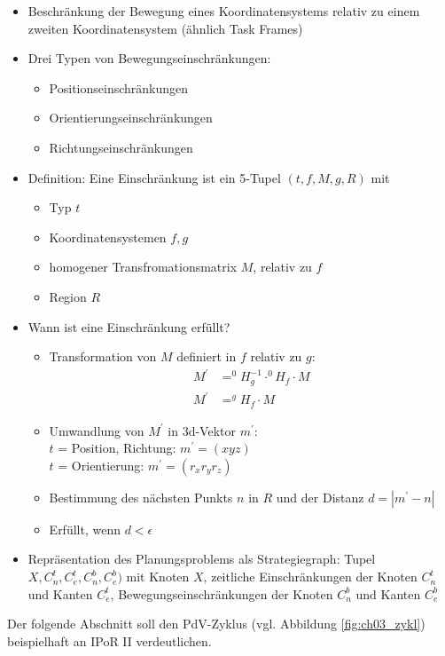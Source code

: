 \begin{itemize}
\item Beschränkung der Bewegung eines Koordinatensystems relativ zu einem zweiten Koordinatensystem (ähnlich \Gu Task Frames\Go) 
\item Drei Typen von Bewegungseinschränkungen:
\begin{itemize}
\item Positionseinschränkungen
\item Orientierungseinschränkungen
\item Richtungseinschränkungen
\end{itemize}
\item Definition: Eine Einschränkung ist ein 5-Tupel $(t, f, M, g, R)$ mit
\begin{itemize}
\item Typ $t$
\item Koordinatensystemen $f, g$
\item homogener Transfromationsmatrix $M$, relativ zu $f$
\item Region $R$
\end{itemize}
\item Wann ist eine Einschränkung erfüllt?
\begin{itemize}
\item Transformation von $M$ definiert in $f$ relativ zu $g$:
\begin{align*}
M^\prime &= ^0H_g^{-1} \cdot ^0 H_f \cdot M\\
M^\prime &= ^g H_f \cdot M
\end{align*}
\item Umwandlung von $M^\prime$ in 3d-Vektor $m^\prime$:\\
$t$ = Position, Richtung: $m^\prime = (x y z)$\\
$t$ = Orientierung: $m^\prime = (r_x r_y r_z )$
\item Bestimmung des nächsten Punkts $n$ in $R$ und der Distanz $d = | m^\prime - n |$
\item Erfüllt, wenn $d < \epsilon$
\end{itemize}
\item Repräsentation des Planungsproblems als \Gu Strategiegraph\Go :
Tupel $X, C^t_n, C^t_e, C^b_n, C^b_e)$ mit Knoten $X$, zeitliche Einschränkungen der Knoten $C^t_n$ und Kanten $C^t_e$,
Bewegungseinschränkungen der Knoten $C^b_n$ und Kanten $C^b_e$
\end{itemize}


Der folgende Abschnitt soll den PdV-Zyklus (vgl. Abbildung \ref{fig:ch03_zykl}) beispielhaft an IPoR II 
verdeutlichen. 
